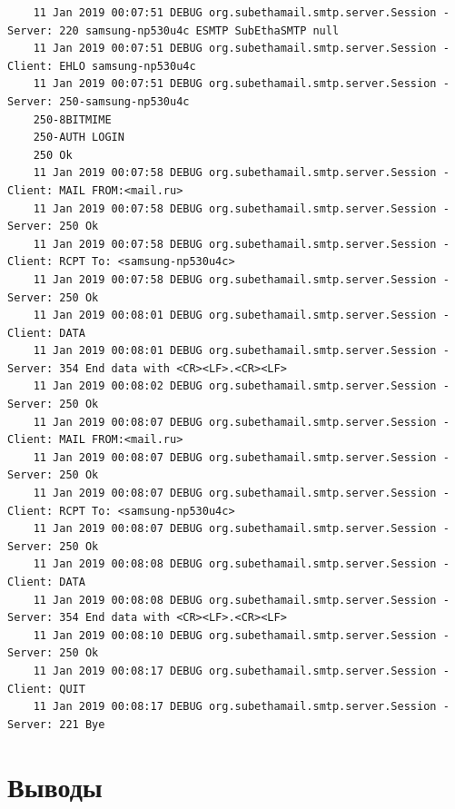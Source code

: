 \documentclass[a4paper,12pt]{report}
\begin{document}
\begin{verbatim}
    11 Jan 2019 00:07:51 DEBUG org.subethamail.smtp.server.Session - Server: 220 samsung-np530u4c ESMTP SubEthaSMTP null
    11 Jan 2019 00:07:51 DEBUG org.subethamail.smtp.server.Session - Client: EHLO samsung-np530u4c
    11 Jan 2019 00:07:51 DEBUG org.subethamail.smtp.server.Session - Server: 250-samsung-np530u4c
    250-8BITMIME
    250-AUTH LOGIN
    250 Ok
    11 Jan 2019 00:07:58 DEBUG org.subethamail.smtp.server.Session - Client: MAIL FROM:<mail.ru>
    11 Jan 2019 00:07:58 DEBUG org.subethamail.smtp.server.Session - Server: 250 Ok
    11 Jan 2019 00:07:58 DEBUG org.subethamail.smtp.server.Session - Client: RCPT To: <samsung-np530u4c>
    11 Jan 2019 00:07:58 DEBUG org.subethamail.smtp.server.Session - Server: 250 Ok
    11 Jan 2019 00:08:01 DEBUG org.subethamail.smtp.server.Session - Client: DATA
    11 Jan 2019 00:08:01 DEBUG org.subethamail.smtp.server.Session - Server: 354 End data with <CR><LF>.<CR><LF>
    11 Jan 2019 00:08:02 DEBUG org.subethamail.smtp.server.Session - Server: 250 Ok
    11 Jan 2019 00:08:07 DEBUG org.subethamail.smtp.server.Session - Client: MAIL FROM:<mail.ru>
    11 Jan 2019 00:08:07 DEBUG org.subethamail.smtp.server.Session - Server: 250 Ok
    11 Jan 2019 00:08:07 DEBUG org.subethamail.smtp.server.Session - Client: RCPT To: <samsung-np530u4c>
    11 Jan 2019 00:08:07 DEBUG org.subethamail.smtp.server.Session - Server: 250 Ok
    11 Jan 2019 00:08:08 DEBUG org.subethamail.smtp.server.Session - Client: DATA
    11 Jan 2019 00:08:08 DEBUG org.subethamail.smtp.server.Session - Server: 354 End data with <CR><LF>.<CR><LF>
    11 Jan 2019 00:08:10 DEBUG org.subethamail.smtp.server.Session - Server: 250 Ok
    11 Jan 2019 00:08:17 DEBUG org.subethamail.smtp.server.Session - Client: QUIT
    11 Jan 2019 00:08:17 DEBUG org.subethamail.smtp.server.Session - Server: 221 Bye
\end{verbatim}


\chapter{Выводы}
\end{document}
